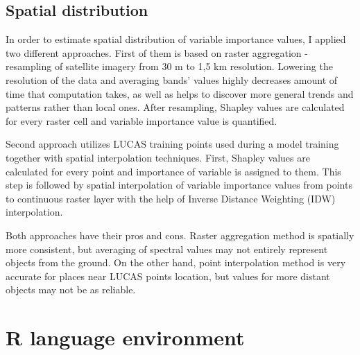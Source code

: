 \documentclass{amuthesis}
\begin{document}
\hypertarget{sec-importance-distribution}{%
\subsection{Spatial distribution}\label{sec-importance-distribution}}

In order to estimate spatial distribution of variable importance values,
I applied two different approaches. First of them is based on raster
aggregation - resampling of satellite imagery from 30 m to 1,5 km
resolution. Lowering the resolution of the data and averaging bands'
values highly decreases amount of time that computation takes, as well
as helps to discover more general trends and patterns rather than local
ones. After resampling, Shapley values are calculated for every raster
cell and variable importance value is quantified.

Second approach utilizes LUCAS training points used during a model
training together with spatial interpolation techniques. First, Shapley
values are calculated for every point and importance of variable is
assigned to them. This step is followed by spatial interpolation of
variable importance values from points to continuous raster layer with
the help of Inverse Distance Weighting (IDW) interpolation.

Both approaches have their pros and cons. Raster aggregation method is
spatially more consistent, but averaging of spectral values may not
entirely represent objects from the ground. On the other hand, point
interpolation method is very accurate for places near LUCAS points
location, but values for more distant objects may not be as reliable.

\hypertarget{sec-r}{%
\section{R language environment}\label{sec-r}}
\end{document}
